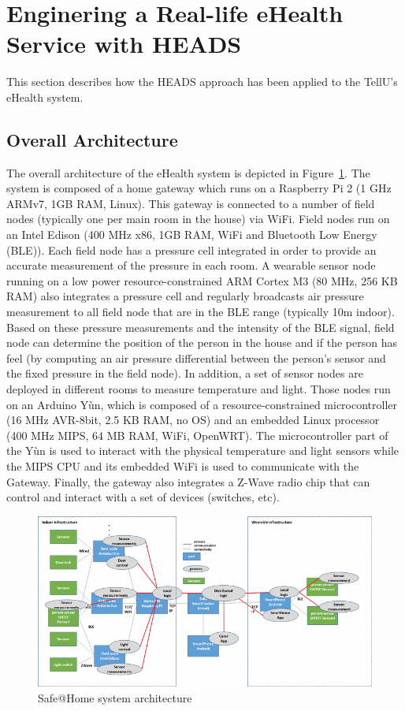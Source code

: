 \section{Enginering a Real-life eHealth Service with HEADS}

This section describes how the HEADS approach has been applied to the TellU's eHealth system. 

\subsection{Overall Architecture}
The overall architecture of the eHealth system is depicted in Figure~\ref{fig:fig3}. The system is composed of a home gateway which runs on a Raspberry Pi 2 (1 GHz ARMv7, 1GB RAM, Linux). This gateway is connected to a number of field nodes (typically one per main room in the house) via WiFi. Field nodes run on an Intel Edison (400 MHz x86, 1GB RAM, WiFi and Bluetooth Low Energy (BLE)). Each field node has a pressure cell integrated in order to provide an accurate measurement of the pressure in each room. A wearable sensor node running on a low power resource-constrained ARM Cortex M3 (80 MHz, 256 KB RAM) also integrates a pressure cell and regularly broadcasts air pressure measurement to all field node that are in the BLE range (typically 10m indoor). Based on these pressure measurements and the intensity of the BLE signal, field node can determine the position of the person in the house and if the person has feel (by computing an air pressure differential between the person's sensor and the fixed pressure in the field node). In addition, a set of sensor nodes are deployed in different rooms to measure temperature and light. Those nodes run on an Arduino Yùn, which is composed of a resource-constrained microcontroller (16 MHz AVR-8bit, 2.5 KB RAM, no OS) and an embedded Linux processor (400 MHz MIPS, 64 MB RAM, WiFi, OpenWRT). The microcontroller part of the Yùn is used to interact with the physical temperature and light sensors while the MIPS CPU and its embedded WiFi is used to communicate with the Gateway. Finally, the gateway also integrates a Z-Wave radio chip that can control and interact with a set of devices (switches, etc). 

\begin{figure}[!t]
	\centering
	\includegraphics[width=0.8\linewidth]{figures/fig3}
	\caption{Safe@Home system architecture}
	\label{fig:fig3}
\end{figure}



